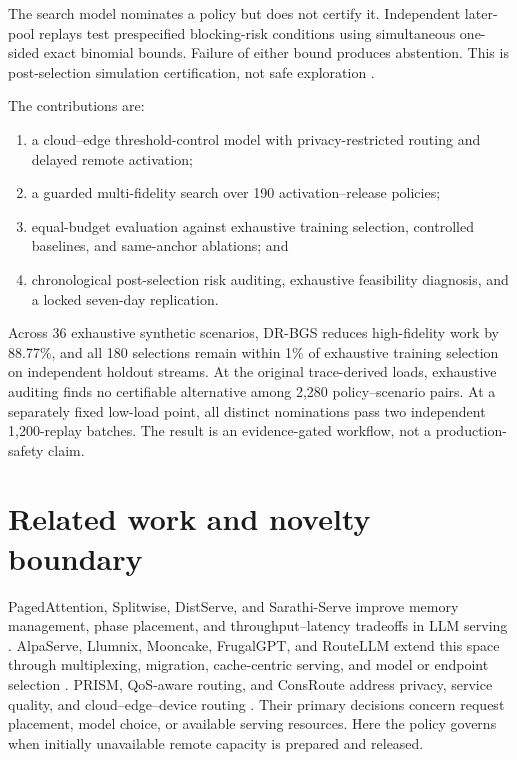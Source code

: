 \documentclass[futureinternet,article,submit,moreauthors]{Definitions/mdpi}
\begin{document}
The search model nominates a policy but does not certify it. Independent later-pool replays test prespecified blocking-risk conditions using simultaneous one-sided exact binomial bounds. Failure of either bound produces abstention. This is post-selection simulation certification, not safe exploration \cite{sui2015safeopt}.

The contributions are:
\begin{enumerate}
\item a cloud--edge threshold-control model with privacy-restricted routing and delayed remote activation;
\item a guarded multi-fidelity search over 190 activation--release policies;
\item equal-budget evaluation against exhaustive training selection, controlled baselines, and same-anchor ablations; and
\item chronological post-selection risk auditing, exhaustive feasibility diagnosis, and a locked seven-day replication.
\end{enumerate}

Across 36 exhaustive synthetic scenarios, DR-BGS reduces high-fidelity work by 88.77\%, and all 180 selections remain within 1\% of exhaustive training selection on independent holdout streams. At the original trace-derived loads, exhaustive auditing finds no certifiable alternative among 2,280 policy--scenario pairs. At a separately fixed low-load point, all distinct nominations pass two independent 1,200-replay batches. The result is an evidence-gated workflow, not a production-safety claim.

\section{Related work and novelty boundary}
\label{sec:related}

PagedAttention, Splitwise, DistServe, and Sarathi-Serve improve memory management, phase placement, and throughput--latency tradeoffs in LLM serving \cite{kwon2023pagedattention,patel2024splitwise,zhong2024distserve,agrawal2024sarathi}. AlpaServe, Llumnix, Mooncake, FrugalGPT, and RouteLLM extend this space through multiplexing, migration, cache-centric serving, and model or endpoint selection \cite{alpaserve2023,llumnix2024,mooncake2025,frugalgpt2024,routellm2025}. PRISM, QoS-aware routing, and ConsRoute address privacy, service quality, and cloud--edge--device routing \cite{prism2026,qosrouting2025,consroute2026}. Their primary decisions concern request placement, model choice, or available serving resources. Here the policy governs when initially unavailable remote capacity is prepared and released.
\end{document}
